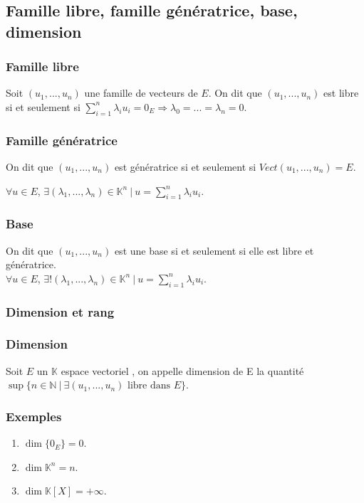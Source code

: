 \documentclass[a4paper,10pt]{book} %
\newcommand{\N}{\mathbb{N}}
\newcommand{\K}{\mathbb{K}}
\newcommand{\ev}{espace vectoriel }
\newcommand{\tq}{~|~}
\newcommand{\displayAmath}{\displaystyle}
\begin{document}
\subsection{Famille libre, famille génératrice, base, dimension}
\subsubsection{Famille libre}
Soit $(u_1,...,u_n)$ une famille de vecteurs de $E$. On dit que $(u_1,...,u_n)$ est libre si et seulement si $\displayAmath\sum_{i=1}^n \lambda_i u_i=0_E \Rightarrow \lambda_0=...=\lambda_n=0$.

\subsubsection{Famille génératrice}
On dit que $(u_1,...,u_n)$ est génératrice si et seulement si $Vect(u_1,...,u_n)=E$.

$\forall u\in E$, $\displayAmath\exists (\lambda_1,...,\lambda_n)\in \K^n \tq u=\sum_{i=1}^n \lambda_iu_i$.

\subsubsection{Base}
On dit que $(u_1,...,u_n)$ est une base si et seulement si elle est libre et génératrice.\\

$\forall u\in E$, $\displayAmath\exists! (\lambda_1,...,\lambda_n)\in \K^n \tq u=\sum_{i=1}^n \lambda_iu_i$.

\subsubsection{Dimension et rang}
\subsubsection{Dimension}
Soit $E$ un $\K$ \ev, on appelle dimension de E la quantité $\sup\{n\in \N\tq \exists (u_1,...,u_n)\text{ libre dans }E\}$.

\subsubsection{Exemples}
\begin{enumerate}
\item $\dim\{0_E\}=0$.
\item $\dim \K^n=n$.
\item $\dim \K[X]=+\infty$.
\end{enumerate}
\end{document}
